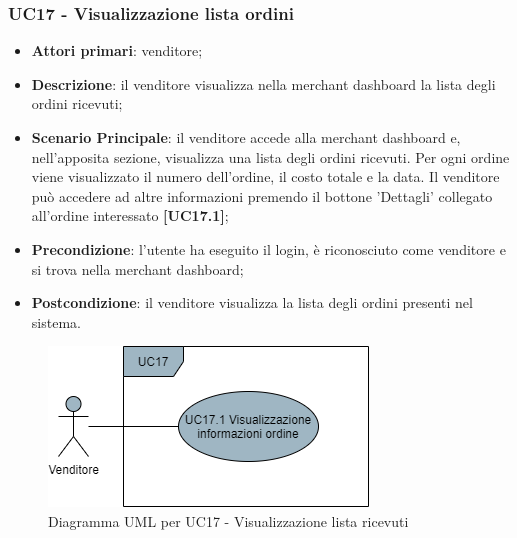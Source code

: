 \subsubsection{UC17 - Visualizzazione lista ordini}
\begin{itemize}
\item \textbf{Attori primari}: venditore;
\item \textbf{Descrizione}: il venditore visualizza nella merchant dashboard la lista degli ordini ricevuti;
\item \textbf{Scenario Principale}: il venditore accede alla merchant dashboard e, nell'apposita sezione, visualizza una lista degli ordini ricevuti. Per ogni ordine viene visualizzato il numero dell'ordine, il costo totale e la data. Il venditore può accedere ad altre informazioni premendo il bottone 'Dettagli' collegato all'ordine interessato \textbf{[UC17.1]};
\item \textbf{Precondizione}: l'utente ha eseguito il login, è riconosciuto come venditore e si trova nella merchant dashboard;
\item \textbf{Postcondizione}: il venditore visualizza la lista degli ordini presenti nel sistema.
\end{itemize}

\begin{figure}[H]
\centering
\includegraphics[scale=0.6]{res/UseCase/Immagini/VisualizzazioneOrdiniMerchant}
\caption{Diagramma UML per UC17 - Visualizzazione lista ricevuti}
\end{figure}

